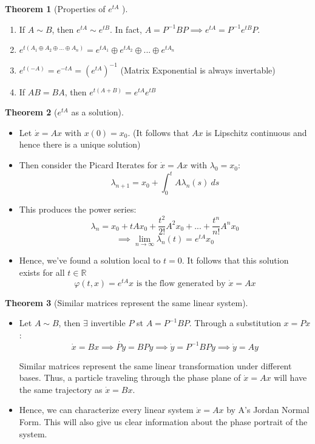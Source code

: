 \documentclass{article}
\newtheorem{thm}{Theorem}[section]
\begin{document}
\begin{thm}[Properties of $e^{tA}$ ]\end{thm}
\begin{enumerate}
    \item If $A \sim B$, then $e^{tA} \sim e^{tB}$.  In fact, $A = P^{-1}BP \implies e^{tA} = P^{-1}e^{tB}P$.

    \item $e^{t(A_1 \oplus A_2 \oplus ... \oplus A_n)} = e^{tA_1} \oplus e^{tA_2} \oplus ... \oplus e^{tA_n}$ 

    \item $e^{t(-A)} = e^{-tA} =
    (e^{tA})^{-1}$ (Matrix Exponential is always invertable)

    \item If $AB = BA$, then $e^{t(A + B)} = e^{tA}e^{tB}$
\end{enumerate}

\newpage
\begin{thm}[$e^{tA}$ as a solution]
\end{thm}
\begin{itemize}
    \item Let $\dot x = Ax$ with $x(0) = x_0$. (It follows that $Ax$ is Lipschitz continuous and hence there is a unique solution)
    
    \item Then consider the Picard Iterates for $\dot x = Ax$ with $\lambda_0 = x_0$: 
    \[\lambda_{n + 1}= x_0 + \int^t_0 A\lambda_n(s)\:ds\]

    \item This produces the power series:
    \[\lambda_{n}= x_0 + tAx_0 + \frac{t^2}{2!} A^2 x_0 + ... + \frac{t^n}{n!} A^n x_0\]
    \[ \implies \lim_{n\to\infty}\lambda_n(t) = e^{tA}x_0\]

    \item Hence, we've found a solution local to $t = 0$. It follows that this solution exists for all $t \in \mathbb{R}$
    \[\varphi(t, x) = e^{tA}x \text{ is the flow generated by } \dot x = Ax\]

\end{itemize}

\begin{thm}[Similar matrices represent the same linear system]
\end{thm}
\begin{itemize}
    \item Let $A \sim B$, then $\exists$ invertible $P$ st $A = P^{-1}BP$. Through a substitution $x = Px$:
    \[\dot x = Bx \implies \dot {Py} = BPy \implies \dot y = P^{-1}BPy \implies \dot y = Ay\]

    Similar matrices represent the same linear transformation under different bases. Thus, a particle traveling through the phase plane of $\dot x = Ax$ will have the same trajectory as $\dot x = Bx$.

    \item Hence, we can characterize every linear system $\dot x = Ax$ by A's Jordan Normal Form. This will also give us clear information about the phase portrait of the system.
    
\end{itemize}
\end{document}

